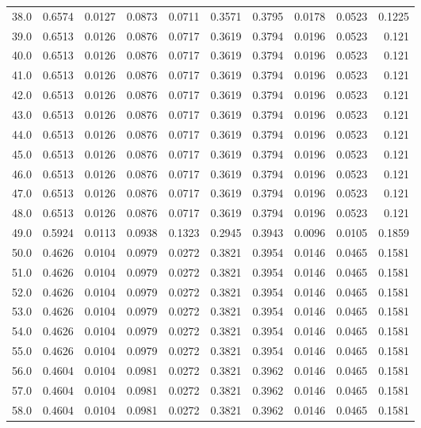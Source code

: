 \begin{longtable}{lrrrrrrrrr}
38.0 & 0.6574 & 0.0127 & 0.0873 & 0.0711 & 0.3571 & 0.3795 & 0.0178 & 0.0523 & 0.1225 \\
39.0 & 0.6513 & 0.0126 & 0.0876 & 0.0717 & 0.3619 & 0.3794 & 0.0196 & 0.0523 & 0.121 \\
40.0 & 0.6513 & 0.0126 & 0.0876 & 0.0717 & 0.3619 & 0.3794 & 0.0196 & 0.0523 & 0.121 \\
41.0 & 0.6513 & 0.0126 & 0.0876 & 0.0717 & 0.3619 & 0.3794 & 0.0196 & 0.0523 & 0.121 \\
42.0 & 0.6513 & 0.0126 & 0.0876 & 0.0717 & 0.3619 & 0.3794 & 0.0196 & 0.0523 & 0.121 \\
43.0 & 0.6513 & 0.0126 & 0.0876 & 0.0717 & 0.3619 & 0.3794 & 0.0196 & 0.0523 & 0.121 \\
44.0 & 0.6513 & 0.0126 & 0.0876 & 0.0717 & 0.3619 & 0.3794 & 0.0196 & 0.0523 & 0.121 \\
45.0 & 0.6513 & 0.0126 & 0.0876 & 0.0717 & 0.3619 & 0.3794 & 0.0196 & 0.0523 & 0.121 \\
46.0 & 0.6513 & 0.0126 & 0.0876 & 0.0717 & 0.3619 & 0.3794 & 0.0196 & 0.0523 & 0.121 \\
47.0 & 0.6513 & 0.0126 & 0.0876 & 0.0717 & 0.3619 & 0.3794 & 0.0196 & 0.0523 & 0.121 \\
48.0 & 0.6513 & 0.0126 & 0.0876 & 0.0717 & 0.3619 & 0.3794 & 0.0196 & 0.0523 & 0.121 \\
49.0 & 0.5924 & 0.0113 & 0.0938 & 0.1323 & 0.2945 & 0.3943 & 0.0096 & 0.0105 & 0.1859 \\
50.0 & 0.4626 & 0.0104 & 0.0979 & 0.0272 & 0.3821 & 0.3954 & 0.0146 & 0.0465 & 0.1581 \\
51.0 & 0.4626 & 0.0104 & 0.0979 & 0.0272 & 0.3821 & 0.3954 & 0.0146 & 0.0465 & 0.1581 \\
52.0 & 0.4626 & 0.0104 & 0.0979 & 0.0272 & 0.3821 & 0.3954 & 0.0146 & 0.0465 & 0.1581 \\
53.0 & 0.4626 & 0.0104 & 0.0979 & 0.0272 & 0.3821 & 0.3954 & 0.0146 & 0.0465 & 0.1581 \\
54.0 & 0.4626 & 0.0104 & 0.0979 & 0.0272 & 0.3821 & 0.3954 & 0.0146 & 0.0465 & 0.1581 \\
55.0 & 0.4626 & 0.0104 & 0.0979 & 0.0272 & 0.3821 & 0.3954 & 0.0146 & 0.0465 & 0.1581 \\
56.0 & 0.4604 & 0.0104 & 0.0981 & 0.0272 & 0.3821 & 0.3962 & 0.0146 & 0.0465 & 0.1581 \\
57.0 & 0.4604 & 0.0104 & 0.0981 & 0.0272 & 0.3821 & 0.3962 & 0.0146 & 0.0465 & 0.1581 \\
58.0 & 0.4604 & 0.0104 & 0.0981 & 0.0272 & 0.3821 & 0.3962 & 0.0146 & 0.0465 & 0.1581 \\

\end{longtable}
